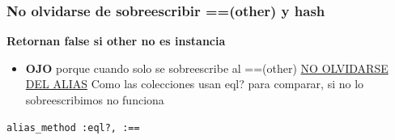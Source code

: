\documentclass[11pt]{article}
\begin{document}
\subsubsection{No olvidarse de sobreescribir ==(other) y hash}
\label{sec:orge293cd6}
\textbf{Retornan false si other no es instancia}
\begin{itemize}
  \item \textbf{OJO} porque cuando solo se sobreescribe al ==(other) \uline{NO OLVIDARSE DEL ALIAS}
    Como las colecciones usan eql? para comparar, si no lo sobreescribimos no funciona
\end{itemize}
\begin{verbatim}
alias_method :eql?, :==
\end{verbatim}
\end{document}
